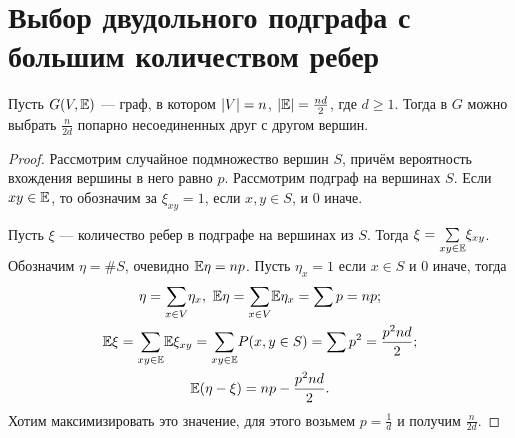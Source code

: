 \section{Выбор двудольного подграфа с большим количеством ребер}

\begin{example} Пусть $G(V, \mathbb{E} )$ --- граф, в котором $\lvert V\rvert = n$,  $\lvert\mathbb{E}\rvert = \frac{nd}{2}$, где $d\ge1$. Тогда в $G$ можно выбрать $\frac{n}{2d}$ попарно несоединенных друг с другом вершин.
\end{example}
    \begin{proof}
        Рассмотрим случайное подмножество вершин $S$, причём вероятность вхождения вершины в него равно $p$. Рассмотрим подграф на вершинах $S$. Если $xy \in \mathbb{E} $, то обозначим за $\xi_{xy} =1$, если $x, y\in S$, и 0 иначе. 
        
       Пусть $\xi$ --- количество ребер в подграфе на вершинах из $S$. Тогда $\xi = \underset{xy\in \mathbb{E} }{\sum}\xi_{xy}$. Обозначим
        $\eta = \#S$, очевидно $\mathbb{E} \eta = np$. Пусть $\eta_x = 1$ если $x\in S$ и 0 иначе, тогда
        \begin{gather*}
            \eta = \underset{x\in V}{\sum}\eta_x, \ \mathbb{E} \eta = \underset{x\in V}{\sum} \mathbb{E} \eta_x = \sum p = np;\\
            \mathbb{E} \xi = \underset{xy\in \mathbb{E} }{\sum} \mathbb{E} \xi_{xy} = \underset{xy\in \mathbb{E} }{\sum} P(x, y \in S) = \sum p^2  = \frac{p^2 nd}{2};\\
            \mathbb{E} (\eta - \xi) = np - \frac{p^2nd}{2}.
        \end{gather*}
        Хотим максимизировать это значение, для этого возьмем $p = \frac{1}{d}$ и получим $\frac{n}{2d}$.
    \end{proof}